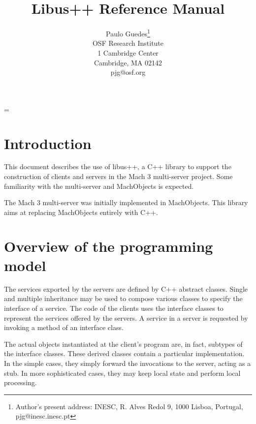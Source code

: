 
\topmargin -30pt
\headsep 36pt
\textheight 9in
\textwidth 6in
\oddsidemargin 0.25in
\raggedbottom
\leftmargini=36pt
\leftmargin=\leftmargini
\sloppy

\pagestyle{plain}




\title{Libus++ Reference Manual}

\author{Paulo Guedes\thanks{
Author's present address: INESC, R. Alves Redol 9, 1000 Lisboa,
Portugal, pjg@inesc.inesc.pt}\\
	OSF Research Institute\\
        1 Cambridge Center\\
        Cambridge, MA 02142\\
        pjg@osf.org
}
\maketitle

\section{Introduction}

This document describes the use of libus++, a C++ library to support
the construction of clients and servers in the Mach 3 multi-server
project. Some familiarity with the multi-server and MachObjects is
expected.

The Mach 3 multi-server was initially implemented in MachObjects. This
library aims at replacing MachObjects entirely with C++. 

\section{Overview of the programming model}
\label{model}

The services exported by the servers are defined by C++ abstract
classes. Single and multiple inheritance may be used to compose
various classes to specify the interface of a service. The code of the
clients uses the interface classes to represent the services offered
by the servers. A service in a server is requested by invoking a
method of an interface class.

The actual objects instantiated at the client's program are, in fact,
subtypes of the interface classes. These derived classes contain a
particular implementation. In the simple cases, they simply forward
the invocations to the server, acting as a stub. In more sophisticated
cases, they may keep local state and perform local processing.


